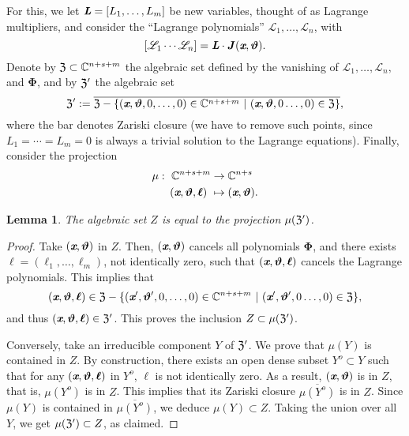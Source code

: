 \documentclass[a4paper]{article}
\def\thetab{\bm{\vartheta}}
\def\xb{\textit{\textbf{x}}}
\def\dt{s}
\def\C{\mathbb{C}}
\newtheorem{lemma}[theorem]{Lemma}
\begin{document}
       For this, we let $\textit{\textbf{L}}=[L_1,\hdots,L_m]$ be new
    variables, thought of as Lagrange multipliers, and consider the
    ``Lagrange polynomials'' $\mathscr{L}_1,\dots,\mathscr{L}_{n}$, with
    \[
    [\mathscr{L}_1 \cdots \mathscr{L}_{n}]=\textit{\textbf{L}}\cdot \bm J(\xb,\thetab).
    \] 
    Denote by $\frak{Z} \subset \C^{n+\dt+m}$ the algebraic set defined by
    the vanishing of $\mathscr{L}_1,\hdots,\mathscr{L}_{n},$ and
    $\bm\Phi$, and by $\frak{Z}'$ the algebraic set
    \[
    \frak{Z}' := \overline{\frak{Z} - \{(\xb,\thetab,0,\hdots,0) \in \C^{n+\dt+m}~|~(\xb,\thetab,0\hdots,0) \in \frak{Z}\}},
    \]
    where the bar denotes Zariski closure (we have to remove such points,
    since $L_1=\cdots=L_m=0$ is always a trivial solution to the Lagrange
    equations). Finally, consider the projection
    \begin{align*} 
    \mu :~ \C^{n+\dt+m} &\rightarrow \C^{n+\dt}\\
    (\xb,\thetab,\bm \ell)~ &\mapsto (\xb,\thetab).
    \end{align*}
    
    \begin{lemma}  
      The algebraic set $Z$ is equal to the projection $\mu(\frak{Z}')$.
    \end{lemma}
    \begin{proof}
      Take $(\xb,\thetab)$ in $Z$. Then, $(\xb,\thetab)$ cancels all
      polynomials $\bm \Phi$, and there exists $\bm
      \ell=(\ell_1,\dots,\ell_m)$, not identically zero, such that
      $(\xb,\thetab,\bm \ell)$ cancels the Lagrange polynomials. This
      implies that 
      \[
      (\xb,\thetab,\bm \ell) \in\frak{Z} -
      \{(\xb',\thetab',0,\hdots,0) \in
      \C^{n+\dt+m}~|~(\xb',\thetab',0\hdots,0) \in
      \frak{Z}\}, 
      \]
      and thus $(\xb,\thetab,\bm \ell) \in\frak{Z}'$. This proves the inclusion
      $Z \subset \mu(\frak{Z}')$.
    
      Conversely, take an irreducible component $Y$ of $\frak Z'$. We
      prove that $\mu(Y)$ is contained in $Z$.  By construction, there
      exists an open dense subset $Y^o \subset Y$ such that for any
      $(\xb,\thetab,\bm \ell)$ in $Y^o$, $\bm \ell$ is not identically
      zero. As a result, $(\xb,\thetab)$ is in $Z$, that is, $\mu(Y^o)$ is
      in $Z$. This implies that its Zariski closure $\overline{\mu(Y^o)}$
      is in $Z$. Since $\mu(Y)$ is contained in $\overline{\mu(Y^o)}$, we
      deduce $\mu(Y) \subset Z$. Taking the union over all $Y$, we get
      $\mu(\frak Z') \subset Z$, as claimed.
    \end{proof} 
    
\end{document}
